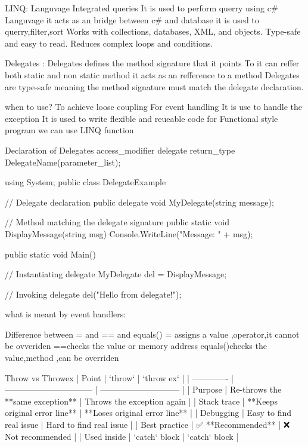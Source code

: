LINQ:
        Languvage Integrated queries
        It is used to perform querry using c# Languvage
        it acts as an bridge between c# and database
        it is used to querry,filter,sort 
        Works with collections, databases, XML, and objects.
        Type-safe and easy to read.
        Reduces complex loops and conditions.


Delegates :
       Delegates defines the method signature that it points To
       it can reffer both static and non static method
       it acts as an refference to a method
       Delegates are type-safe meaning the method signature must match the delegate declaration.

  when to use?
        To achieve loose coupling
        For event handling
        It is use to handle the exception
        It is used to write flexible and reueable code
        for Functional style program we can use LINQ function

Declaration of Delegates 
        access_modifier delegate return_type DelegateName(parameter_list);

using System;
public class DelegateExample
{
    // Delegate declaration
    public delegate void MyDelegate(string message);

    // Method matching the delegate signature
    public static void DisplayMessage(string msg)
    {
        Console.WriteLine("Message: " + msg);
    }

    public static void Main()
    {
        // Instantiating delegate
        MyDelegate del = DisplayMessage;

        // Invoking delegate
        del("Hello from delegate!");
    }
}

what is meant by event handlers:


Difference between = and == and equals()
        = assigns a value ,operator,it cannot be ovveriden
        ==checks the value or memory address
        equals()checks the value,method ,can be overriden

Throw vs Throwex
| Point         | `throw`                          | `throw ex`                    |
| ------------- | -------------------------------- | ----------------------------- |
| Purpose       | Re-throws the **same exception** | Throws the exception again    |
| Stack trace   | **Keeps original error line**    | **Loses original error line** |
| Debugging     | Easy to find real issue          | Hard to find real issue       |
| Best practice | ✅ **Recommended**                | ❌ Not recommended             |
| Used inside   | `catch` block                    | `catch` block                 |


